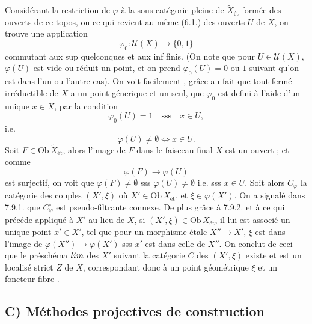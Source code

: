 \documentclass[11pt,a4paper]{article}
\begin{document}
Considérant la restriction de $\varphi$ à la sous-catégorie pleine de
$\widetilde{X}_{\text{ét}}$ formée des ouverts de ce topos, ou ce qui revient
au même (6.1.) des ouverts $U$ de $X$, on trouve une application
\[
  \varphi_0 : \mathcal{U}(X) \longrightarrow \{0, 1\}
\]
commutant aux sup quelconques et aux inf finis. (On note que pour $U \in
\mathcal{U}(X)$, $\varphi(U)$ est vide ou réduit un point, et on prend
$\varphi_0(U) = 0$ ou $1$ suivant qu'on est dans l'un ou l'autre cas). On voit
facilement \struck{\ill{}}, grâce au fait que tout fermé irréductible de $X$
a un point génerique et un seul, que $\varphi_0$ est defini à l'aide d'un
\struck{\ill{}} unique $x \in X$, par la condition
\[
  \varphi_0(U) = 1 \quad \text{sss} \quad x \in U ,
\]
i.e.
\[
  \varphi(U) \neq \emptyset \iff x \in U .
\]
Soit $F \in \mathrm{Ob}\,\widetilde{X}_{\text{ét}}$, alors l'image de $F$ dans le
faisceau final $X$ est un ouvert ; et comme
\[
  \varphi(F) \longrightarrow \varphi(U)
\]
est surjectif, on voit que $\varphi(F) \neq \emptyset$ sss $\varphi(U) \neq
\emptyset$ i.e. sss $x \in U$. Soit alors $C_\varphi$ la catégorie des couples
$(X', \xi)$ où $X' \in \mathrm{Ob}\,X_{\text{ét}}$, et $\xi \in \varphi(X')$. On a
signalé dans 7.9.1. que $C_\varphi^{\circ}$ est pseudo-filtrante connexe. De
plus grâce à 7.9.2. et à ce qui précéde appliqué à $X'$ au lieu de $X$, si
$(X', \xi) \in \mathrm{Ob}\,X_{\text{ét}}$, il lui est associé un unique point
$x' \in X'$, tel que pour un morphisme étale $X'' \longrightarrow X'$, $\xi$
est dans l'image de $\varphi(X'') \longrightarrow \varphi(X')$ sss $x'$ est
dans celle de $X''$. On conclut de ceci que le préschéma $\varprojlim$ des $X'$
suivant la catégorie $C$ des $(X', \xi)$ existe et est un localisé strict $Z$
de $X$, correspondant donc à un point géométrique $\xi$ et un foncteur fibre
.



\subsection*{C) Méthodes projectives de construction}

\end{document}
